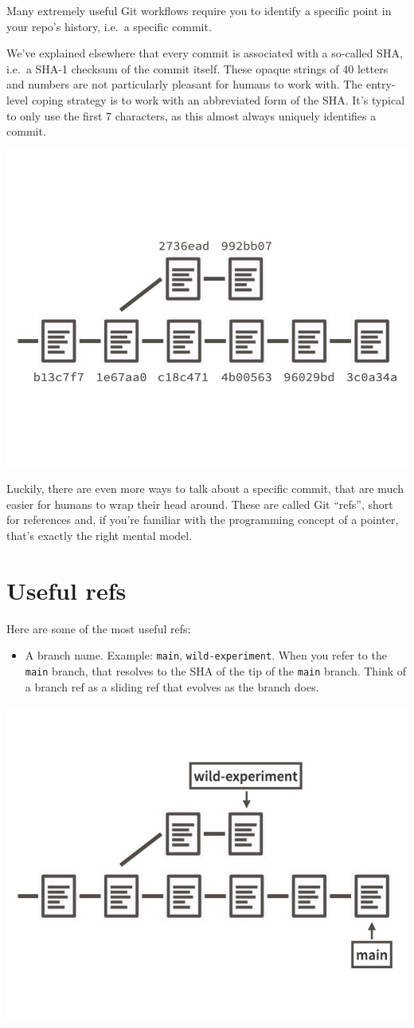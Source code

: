 \documentclass[
]{book}
\providecommand{\tightlist}{%
  \setlength{\itemsep}{0pt}\setlength{\parskip}{0pt}}
\begin{document}
Many extremely useful Git workflows require you to identify a specific point in your repo's history, i.e.~a specific commit.

We've explained elsewhere that every commit is associated with a so-called SHA, i.e.~a SHA-1 checksum of the commit itself.
These opaque strings of 40 letters and numbers are not particularly pleasant for humans to work with.
The entry-level coping strategy is to work with an abbreviated form of the SHA.
It's typical to only use the first 7 characters, as this almost always uniquely identifies a commit.

\begin{center}\includegraphics[width=0.6\linewidth]{img/refs-only-shas} \end{center}

Luckily, there are even more ways to talk about a specific commit, that are much easier for humans to wrap their head around.
These are called Git ``refs'', short for references and, if you're familiar with the programming concept of a pointer, that's exactly the right mental model.

\section{Useful refs}\label{useful-refs}

Here are some of the most useful refs:

\begin{itemize}
\tightlist
\item
  A branch name.
  Example: \texttt{main}, \texttt{wild-experiment}.
  When you refer to the \texttt{main} branch, that resolves to the SHA of the tip of
  the \texttt{main} branch.
  Think of a branch ref as a sliding ref that evolves as the branch does.
\end{itemize}

\begin{center}\includegraphics[width=0.6\linewidth]{img/refs-only-branches} \end{center}
\end{document}
